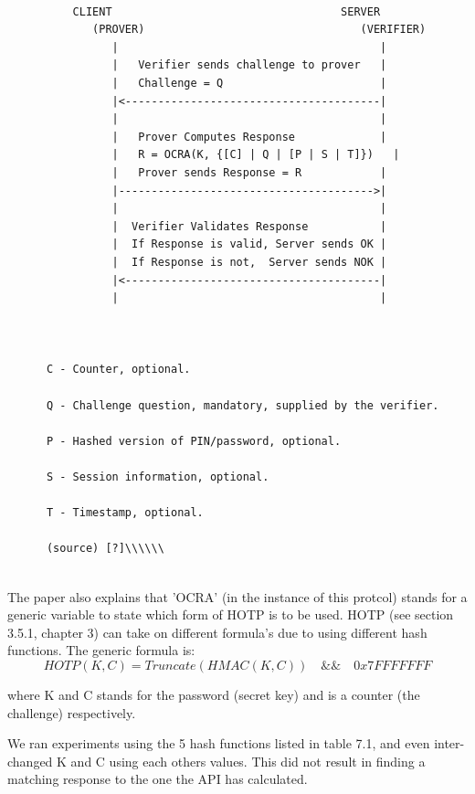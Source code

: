 \documentclass[bsc,frontabs,twoside,singlespacing,parskip,deptreport]{infthesis}     %
\begin{document}
\pagebreak
\begin{Verbatim}[commandchars=\\\{\}, fontsize=\small]

	      CLIENT                                   SERVER
             (PROVER)                                 (VERIFIER)
                |                                        |
                |   Verifier sends challenge to prover   |
                |   Challenge = Q                        |
                |<---------------------------------------|
                |                                        |
                |   Prover Computes Response             |
                |   R = OCRA(K, {[C] | Q | [P | S | T]})   |
                |   Prover sends Response = R            |
                |--------------------------------------->|
                |                                        |
                |  Verifier Validates Response           |
                |  If Response is valid, Server sends OK |
                |  If Response is not,  Server sends NOK |
                |<---------------------------------------|
                |                                        |



      C - Counter, optional.

      Q - Challenge question, mandatory, supplied by the verifier.

      P - Hashed version of PIN/password, optional.

      S - Session information, optional.

      T - Timestamp, optional.
      
      (source) [?]\\\\\\
            
\end{Verbatim}


The paper also explains that 'OCRA' (in the instance of this protcol) stands for a generic variable to state which form of HOTP is to be used. HOTP (see section 3.5.1, chapter 3) can take on different formula's due to using different hash functions. The generic formula is:\\
$$HOTP(K,C) = Truncate(HMAC(K,C)) \quad \&\& \quad 0x7FFFFFFF$$

where K and C stands for the password (secret key) and is a counter (the challenge) respectively.

We ran experiments using the 5 hash functions listed in table 7.1, and even inter-changed K and C using each others values. This did not result in finding a matching response to the one the API has calculated.\\
\end{document}
